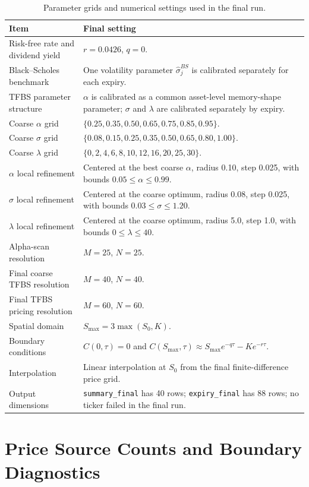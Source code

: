 \documentclass[11pt,a4paper]{report}
\begin{document}
{\small
\begin{longtable}{p{}p{}}
\caption{Parameter grids and numerical settings used in the final run.}
\label{tab:repro_numerical_settings}\\
\toprule
Item & Final setting \\
\midrule
Risk-free rate and dividend yield & $r=0.0426$, $q=0$. \\
Black--Scholes benchmark & One volatility parameter $\widehat{\sigma}^{BS}_j$ is calibrated separately for each expiry. \\
TFBS parameter structure & $\alpha$ is calibrated as a common asset-level memory-shape parameter; $\sigma$ and $\lambda$ are calibrated separately by expiry. \\
Coarse $\alpha$ grid & $\{0.25,0.35,0.50,0.65,0.75,0.85,0.95\}$. \\
Coarse $\sigma$ grid & $\{0.08,0.15,0.25,0.35,0.50,0.65,0.80,1.00\}$. \\
Coarse $\lambda$ grid & $\{0,2,4,6,8,10,12,16,20,25,30\}$. \\
$\alpha$ local refinement & Centered at the best coarse $\alpha$, radius 0.10, step 0.025, with bounds $0.05\leq \alpha\leq0.99$. \\
$\sigma$ local refinement & Centered at the coarse optimum, radius 0.08, step 0.025, with bounds $0.03\leq\sigma\leq1.20$. \\
$\lambda$ local refinement & Centered at the coarse optimum, radius 5.0, step 1.0, with bounds $0\leq\lambda\leq40$. \\
Alpha-scan resolution & $M=25$, $N=25$. \\
Final coarse TFBS resolution & $M=40$, $N=40$. \\
Final TFBS pricing resolution & $M=60$, $N=60$. \\
Spatial domain & $S_{\max}=3\max(S_0,K)$. \\
Boundary conditions & $C(0,\tau)=0$ and $C(S_{\max},\tau)\approx S_{\max}e^{-q\tau}-Ke^{-r\tau}$. \\
Interpolation & Linear interpolation at $S_0$ from the final finite-difference price grid. \\
Output dimensions & \texttt{summary\_final} has 40 rows; \texttt{expiry\_final} has 88 rows; no ticker failed in the final run. \\
\bottomrule
\end{longtable}
}

\section{Price Source Counts and Boundary Diagnostics}
\end{document}
